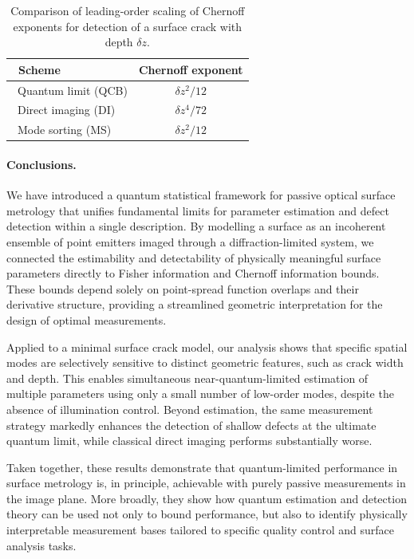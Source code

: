 \documentclass[reprint,amsmath,amssymb,aps,prl,floatfix,groupedaddress,superscriptaddress]{revtex4-2}
\begin{document}
\begin{table}[h]
\centering
\begin{tabular}{lc}
\hline \hline
\  Scheme & \qquad  Chernoff exponent \qquad  \\ \hline
\  Quantum limit (QCB) &\qquad  ${\delta z^2}/{12}$\qquad \\
\  Direct imaging (DI) &\qquad ${\delta z^4}/{72}$ \qquad\\
\  Mode sorting (MS) & \qquad ${\delta z^2}/{12}$\qquad\\ \hline \hline
\end{tabular}
\caption{Comparison of leading-order scaling of Chernoff exponents for detection of a surface crack with depth $\delta z$.}
\label{tab:chernoff_comparison}
\end{table}



\paragraph{\bfseries Conclusions.}
We have introduced a quantum statistical framework for passive optical surface metrology that unifies fundamental limits for parameter estimation and defect detection within a single description. By modelling a surface as an incoherent ensemble of point emitters imaged through a diffraction-limited system, we connected the estimability and detectability of physically meaningful surface parameters directly to Fisher information and Chernoff information bounds.
These bounds depend solely on point-spread function overlaps and their derivative structure, providing a streamlined geometric interpretation for the design of optimal measurements.

Applied to a minimal surface crack model, our analysis shows that specific spatial modes are selectively sensitive to distinct geometric features, such as crack width and depth. This enables simultaneous near-quantum-limited estimation of multiple parameters using only a small number of low-order modes, despite the absence of illumination control. Beyond estimation, the same measurement strategy markedly enhances the detection of shallow defects at the ultimate quantum limit, while classical direct imaging performs substantially worse.

Taken together, these results demonstrate that quantum-limited performance in surface metrology is, in principle, achievable with purely passive measurements in the image plane. More broadly, they show how quantum estimation and detection theory can be used not only to bound performance, but also to identify physically interpretable measurement bases tailored to specific quality control and surface analysis tasks.
\end{document}
